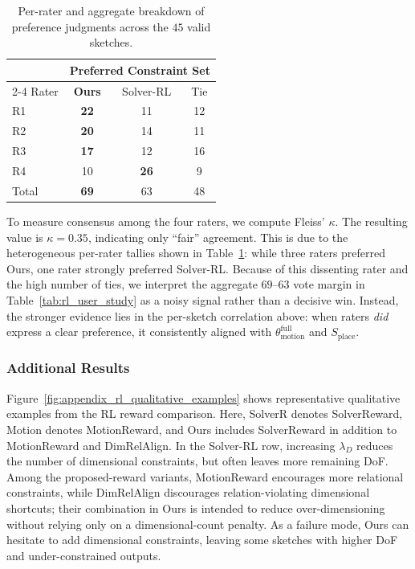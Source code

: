 \begin{table}[t]
    \centering
    \footnotesize
    \caption{Per-rater and aggregate breakdown of preference judgments across the $45$ valid sketches.}
    \begin{tabular}{@{}l ccc @{}}
        \toprule
        & \multicolumn{3}{c}{Preferred Constraint Set} \\
        \cmidrule(l){2-4}
        Rater & \textbf{Ours} & Solver-RL & Tie \\
        \midrule
        R1 & \textbf{22} & 11 & 12 \\
        R2 & \textbf{20} & 14 & 11 \\
        R3 & \textbf{17} & 12 & 16 \\
        R4 & 10 & \textbf{26} &  9 \\
        \midrule
        Total & \textbf{69} & 63 & 48 \\
        \bottomrule
    \end{tabular}
    \label{tab:appendix_per_rater_votes}
\end{table}

To measure consensus among the four raters, we compute Fleiss' $\kappa$. The resulting value is $\kappa = 0.35$, indicating only ``fair'' agreement. This is due to the heterogeneous per-rater tallies shown in Table~\ref{tab:appendix_per_rater_votes}: while three raters preferred Ours, one rater strongly preferred Solver-RL.
Because of this dissenting rater and the high number of ties, we interpret the aggregate $69$--$63$ vote margin in Table~\ref{tab:rl_user_study} as a noisy signal rather than a decisive win. Instead, the stronger evidence lies in the per-sketch correlation above: when raters \emph{did} express a clear preference, it consistently aligned with $\theta_{\mathrm{motion}}^{\mathrm{full}}$ and $S_{\mathrm{place}}$.

\subsubsection{Additional Results}
\label{sec:appendix_rl_additional_results}

Figure~\ref{fig:appendix_rl_qualitative_examples} shows representative qualitative examples from the RL reward comparison. Here, SolverR denotes SolverReward, Motion denotes MotionReward, and Ours includes SolverReward in addition to MotionReward and DimRelAlign. In the Solver-RL row, increasing $\lambda_D$ reduces the number of dimensional constraints, but often leaves more remaining DoF. Among the proposed-reward variants, MotionReward encourages more relational constraints, while DimRelAlign discourages relation-violating dimensional shortcuts; their combination in Ours is intended to reduce over-dimensioning without relying only on a dimensional-count penalty. As a failure mode, Ours can hesitate to add dimensional constraints, leaving some sketches with higher DoF and under-constrained outputs.

